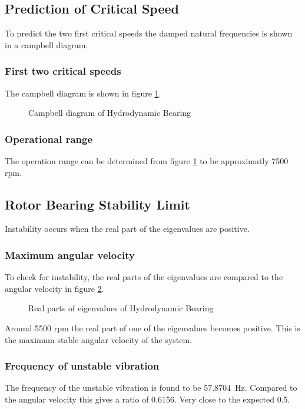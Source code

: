 \subsection{Prediction of Critical Speed}
To predict the two first critical speeds the damped natural frequencies is shown in a campbell diagram.

\subsubsection{First two critical speeds}
The campbell diagram is shown in figure \ref{fig:hydrodynamic_bearing_campbell}.
\begin{figure}[htbp]
    \centering
    
    \caption{Campbell diagram of Hydrodynamic Bearing}
    \label{fig:hydrodynamic_bearing_campbell}
\end{figure}


\subsubsection{Operational range}
The operation range can be determined from figure \ref{fig:hydrodynamic_bearing_campbell} to be approximatly 7500 rpm.

\subsection{Rotor Bearing Stability Limit}
Instability occurs when the real part of the eigenvalues are positive.

\subsubsection{Maximum angular velocity}
To check for instability, the real parts of the eigenvalues are compared to the angular velocity in figure \ref{fig:hydrodynamic_bearing_eigenvalues}.
\begin{figure}[htbp]
    \centering
    
    \caption{Real parts of eigenvalues of Hydrodynamic Bearing}
    \label{fig:hydrodynamic_bearing_eigenvalues}
\end{figure}
Around 5500 rpm the real part of one of the eigenvalues becomes positive. This is the maximum stable angular velocity of the system.

\subsubsection{Frequency of unstable vibration}
The frequency of the unstable vibration is found to be \SI{57.8704}{\hertz}. Compared to the angular velocity this gives a ratio of 0.6156. Very close to the expected 0.5.

